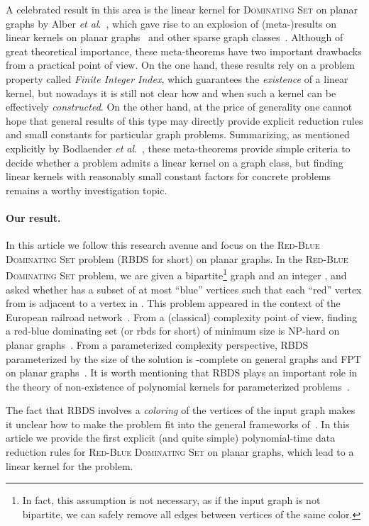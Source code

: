 \documentclass[a4paper,11pt]{article}
\newcommand{\drb}    [0] {rbds\xspace}
\newcommand{\RBDS}{\textsc{RBDS}\xspace}
\newcommand{\NP}{\ensuremath{\text{NP}}\xspace}
\begin{document}
A celebrated result in this area is the linear kernel for \textsc{Dominating Set} on planar graphs by Alber \emph{et al}.~\cite{AFN04}, which gave rise to an explosion of (meta-)results on linear kernels on planar graphs~\cite{GuNi07} and other sparse graph classes~\cite{BFL+09,FLST10,KLP+12}.
Although of great theoretical importance, these meta-theorems have two important drawbacks from a practical point of view. On the one hand, these results rely on a problem property called \emph{Finite Integer Index}, which guarantees the {\sl existence} of a linear kernel, but nowadays it is still not clear how and when such a kernel can be effectively {\sl constructed}. On the other hand, at the price of generality one cannot hope that general results of this type may directly provide explicit reduction rules and small constants for particular graph problems. Summarizing, as mentioned explicitly by Bodlaender \emph{et al}.~\cite{BFL+09}, these meta-theorems provide simple criteria to decide whether a problem admits a linear kernel on a graph class, but finding linear kernels with reasonably small constant factors for concrete problems remains a worthy investigation topic.


\paragraph{Our result.} In this article we follow this research avenue and focus on the \textsc{Red-Blue Dominating Set} problem (\RBDS for short) on planar graphs. In the \textsc{Red-Blue Dominating Set} problem, we are given a bipartite\footnote{In fact, this assumption is not necessary, as if the input graph  is not bipartite, we can safely remove all edges between vertices of the same color.} graph  and an integer , and asked whether  has a subset  of at most  ``blue'' vertices such that each ``red'' vertex from  is adjacent to a vertex in . This problem appeared in the context of the European railroad network~\cite{Wei98}.
From a (classical) complexity point of view, finding a red-blue dominating set (or \drb for short) of minimum size is \NP-hard on planar graphs~\cite{ABFN00}. From a parameterized complexity perspective, \RBDS parameterized by the size of the solution is -complete on general graphs and {\sf FPT} on planar graphs~\cite{DF99}. It is worth mentioning that \RBDS plays an important role in the theory of non-existence of polynomial kernels for parameterized problems~\cite{DLS09}.



The fact that \RBDS involves a {\sl coloring} of the vertices of the input graph makes it unclear how to make the problem fit into the general frameworks of~\cite{GuNi07,BFL+09,FLST10,KLP+12}. In this article we provide the first explicit (and quite simple) polynomial-time data reduction rules for \textsc{Red-Blue Dominating Set} on planar graphs, which lead to a linear kernel for the problem.
\end{document}
